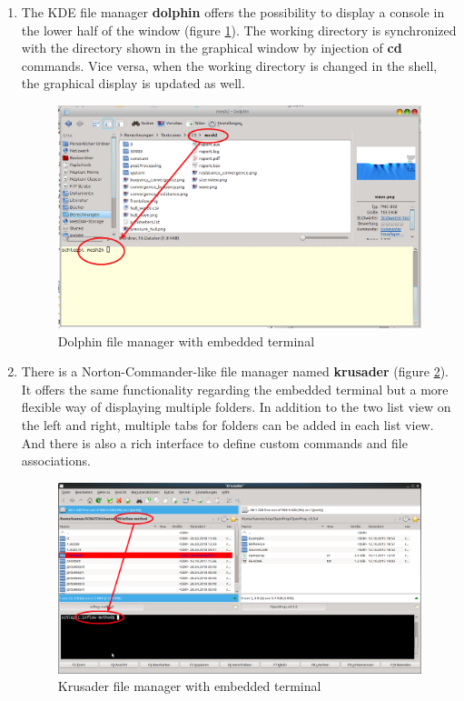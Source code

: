 \begin{enumerate}

 \item The KDE file manager \textbf{dolphin} offers the possibility to display a console in the lower half of the window (figure \ref{fig:dolphin}). The working directory is synchronized with the directory shown in the graphical window by injection of \textbf{cd} commands. Vice versa, when the working directory is changed in the shell, the graphical display is updated as well.
 
 \begin{figure}[h!]
 \includegraphics[width=\linewidth]{figs/intro/dolphin_with_terminal} 
 \caption{Dolphin file manager with embedded terminal}
 \label{fig:dolphin}
 \end{figure}

 \item There is a Norton-Commander-like file manager named \textbf{krusader} (figure \ref{fig:krusader}). It offers the same functionality regarding the embedded terminal but a more flexible way of displaying multiple folders. In addition to the two list view on the left and right, multiple tabs for folders can be added in each list view. And there is also a rich interface to define custom commands and file associations.
 
 \begin{figure}[h!]
 \includegraphics[width=\linewidth]{figs/intro/krusader_with_terminal}
 \caption{Krusader file manager with embedded terminal}
 \label{fig:krusader}
 \end{figure}
 
\end{enumerate}






